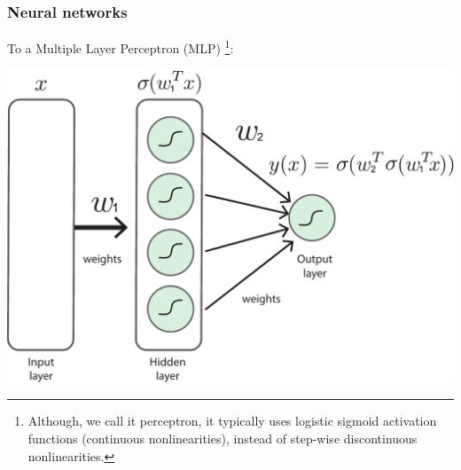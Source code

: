 \documentclass[10pt]{beamer}
\begin{document}
\begin{frame}[fragile]
\frametitle{Neural networks}

To a Multiple Layer Perceptron (MLP) \footnote{Although, we call it
  perceptron, it typically uses logistic {\color{blue} sigmoid} activation functions
  (continuous nonlinearities), instead of step-wise discontinuous
  nonlinearities. 
  }:\vspace{5pt}\\

	\centerline{\includegraphics[scale=0.5]{figures/MLP_variant.pdf}}

\end{frame}
\end{document}
